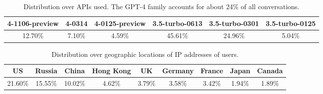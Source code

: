 \documentclass{article} %
\begin{document}




\begin{table}[!t]
    \centering
        \caption{\label{tab:model-distribution}Distribution over APIs used. The GPT-4 family accounts for about 24\% of all conversations.}
    \begin{tabular}{@{}cccccc@{}}
    \toprule
            4-1106-preview & 4-0314 & 4-0125-preview & 3.5-turbo-0613 & 3.5-turbo-0301 & 3.5-turbo-0125 \\\midrule
12.70\%        & 7.10\% & 4.59\%         & 45.61\%        & 24.96\%        & 5.04\%        \\
        \bottomrule
    \end{tabular}
\end{table}

\begin{table}[!t]
    \centering
        \caption{\label{tab:geo-country}Distribution over geographic locations of IP addresses of users.}
    \begin{tabular}{@{}ccccccccc@{}}
    \toprule
     US & Russia & China & Hong Kong & UK & Germany & France & Japan & Canada     \\\midrule
      21.60\% & 15.55\% & 10.02\% & 4.62\% & 3.79\% & 3.58\% & 3.42\% & 1.94\% & 1.89\% \\
        \bottomrule
    \end{tabular}
\end{table}
\end{document}

